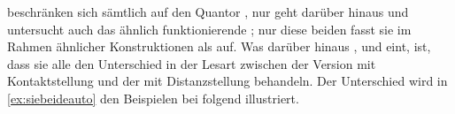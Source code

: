 




\textcites{sportiche1988,shlonsky1991,merchant1996} beschränken sich sämtlich
auf den Quantor , nur \citet{pittner1995} geht darüber hinaus und
untersucht auch das ähnlich funktionierende ; nur diese beiden fasst
sie im Rahmen ähnlicher Konstruktionen als  auf. Was
darüber hinaus \citeauthor{shlonsky1991}, \citeauthor{pittner1995} und
\citeauthor{merchant1996} eint, ist, dass sie alle den Unterschied in der
Lesart zwischen der Version mit Kontaktstellung und der mit Distanzstellung
behandeln. Der Unterschied wird in \cref{ex:siebeideauto} den Beispielen bei
\citet[30--31]{pittner1995} folgend illustriert.

